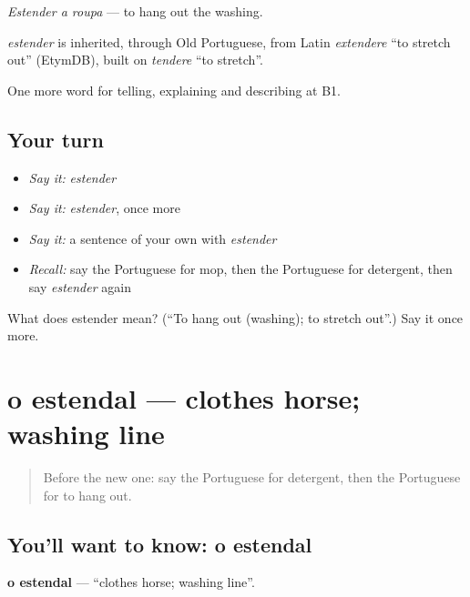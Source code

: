 \emph{Estender a roupa} — to hang out the washing.

\begin{cousinweb}
\emph{estender} is inherited, through Old Portuguese, from Latin \emph{extendere} \textquotedblleft{}to stretch out\textquotedblright{} (EtymDB), built on \emph{tendere} \textquotedblleft{}to stretch\textquotedblright{}.
\end{cousinweb}

\begin{grammarlens}[title={What you've built}]
One more word for telling, explaining and describing at B1.
\end{grammarlens}

\subsection*{Your turn}
\begin{itemize}
\raggedright
  \item \emph{Say it:} \emph{estender}
  \item \emph{Say it:} \emph{estender}, once more
  \item \emph{Say it:} a sentence of your own with \emph{estender}
  \item \emph{Recall:} say the Portuguese for mop, then the Portuguese for detergent, then say \emph{estender} again
\end{itemize}

\begin{tcolorbox}[breakable,colback=teal!4,colframe=teal!35!black,title={Before you move on}]
What does estender mean? (\textquotedblleft{}To hang out (washing); to stretch out\textquotedblright{}.) Say it once more.
\end{tcolorbox}
\section[o estendal]{o estendal — clothes horse; washing line}

\label{lesson:PT-C529-estendal}



\begin{quote}
Before the new one: say the Portuguese for detergent, then the Portuguese for to hang out.
\end{quote}

\subsection*{You'll want to know: o estendal}
\textbf{o estendal} — \textquotedblleft{}clothes horse; washing line\textquotedblright{}.


